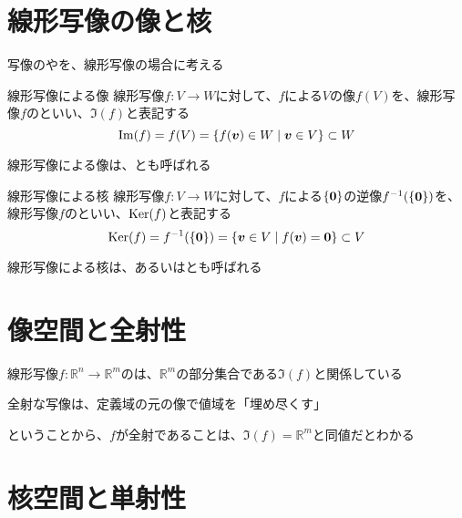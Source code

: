 \documentclass[../../../topic_linear-algebra]{subfiles}
\begin{document}
\sectionline
\section{線形写像の像と核}

写像のやを、線形写像の場合に考える

\begin{definition}{線形写像による像}
  線形写像$f\colon V \to W$に対して、$f$による$V$の像$f(V)$を、線形写像$f$のといい、$\Im(f)$と表記する
  \begin{equation*}
    \Im(f) = f(V) = \{ f(\vb*{v}) \in W \mid \vb*{v} \in V \} \subset W
  \end{equation*}
\end{definition}

線形写像による像は、とも呼ばれる

\br

\begin{definition}{線形写像による核}
  線形写像$f\colon V \to W$に対して、$f$による$\{\vb*{0}\}$の逆像$f^{-1}(\{\vb*{0}\})$を、線形写像$f$のといい、$\operatorname{Ker}(f)$と表記する
  \begin{equation*}
    \operatorname{Ker}(f) = f^{-1}(\{\vb*{0}\}) = \{ \vb*{v} \in V \mid f(\vb*{v}) = \vb*{0} \} \subset V
  \end{equation*}
\end{definition}

線形写像による核は、あるいはとも呼ばれる

\sectionline
\section{像空間と全射性}

線形写像$f\colon \mathbb{R}^n \to \mathbb{R}^m$のは、$\mathbb{R}^m$の部分集合である$\Im(f)$と関係している

\begin{shaded}
  全射な写像は、定義域の元の像で値域を「埋め尽くす」
\end{shaded}

ということから、$f$が全射であることは、$\Im(f) = \mathbb{R}^m$と同値だとわかる

\sectionline
\section{核空間と単射性}
\end{document}
